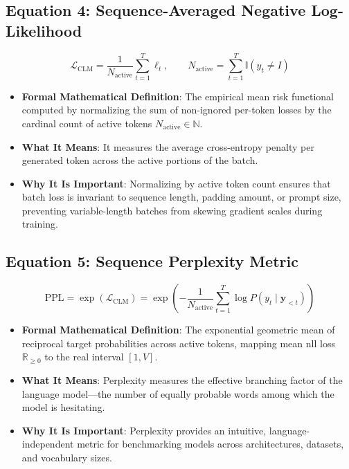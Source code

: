 \documentclass[11pt,a4paper]{article}
\theoremstyle{definition}
\begin{document}
\subsection{\textbf{Equation 4: Sequence-Averaged Negative Log-Likelihood}}
{\boldmath
\begin{equation}
\mathcal{L}_{\text{CLM}} = \frac{1}{N_{\text{active}}} \sum_{t=1}^T \ell_t, \qquad N_{\text{active}} = \sum_{t=1}^T \mathbb{I}(y_t \ne I)
\end{equation}
}
\begin{itemize}
    \item \textbf{Formal Mathematical Definition}:
    The empirical mean risk functional computed by normalizing the sum of non-ignored per-token losses by the cardinal count of active tokens $N_{\text{active}} \in \mathbb{N}$.
    \item \textbf{What It Means}:
    It measures the average cross-entropy penalty per generated token across the active portions of the batch.
    \item \textbf{Why It Is Important}:
    Normalizing by active token count ensures that batch loss is invariant to sequence length, padding amount, or prompt size, preventing variable-length batches from skewing gradient scales during training.
\end{itemize}

\subsection{\textbf{Equation 5: Sequence Perplexity Metric}}
{\boldmath
\begin{equation}
\text{PPL} = \exp(\mathcal{L}_{\text{CLM}}) = \exp\left( -\frac{1}{N_{\text{active}}} \sum_{t=1}^T \log P(y_t \mid \mathbf{y}_{<t}) \right)
\end{equation}
}
\begin{itemize}
    \item \textbf{Formal Mathematical Definition}:
    The exponential geometric mean of reciprocal target probabilities across active tokens, mapping mean nll loss $\mathbb{R}_{\ge 0}$ to the real interval $[1, V]$.
    \item \textbf{What It Means}:
    Perplexity measures the effective branching factor of the language model—the number of equally probable words among which the model is hesitating.
    \item \textbf{Why It Is Important}:
    Perplexity provides an intuitive, language-independent metric for benchmarking models across architectures, datasets, and vocabulary sizes.
\end{itemize}
\end{document}
